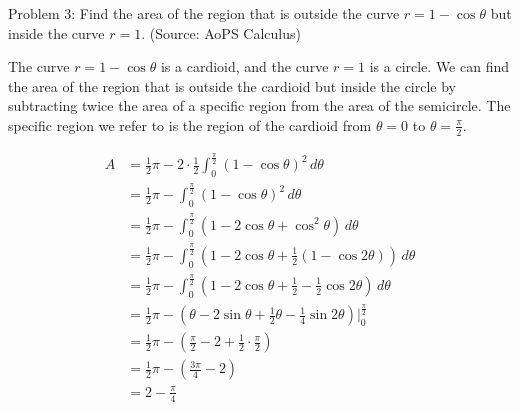 Problem 3: Find the area of the region that is outside the curve $r = 1 - \cos \theta$ but inside the curve $r = 1$. (Source: AoPS Calculus)

The curve $r = 1 - \cos \theta$ is a cardioid, and the curve $r = 1$ is a circle. We can find the area of the region that is outside the cardioid but inside the circle by subtracting twice the area of a specific region from the area of the semicircle. The specific region we refer to is the region of the cardioid from $\theta = 0$ to $\theta = \frac{\pi}{2}$.

\begin{align*}
A &= \frac{1}{2} \pi - 2 \cdot \frac{1}{2} \int_0^{\frac{\pi}{2}} (1 - \cos \theta)^2 \, d\theta \\
&= \frac{1}{2} \pi - \int_0^{\frac{\pi}{2}} (1 - \cos \theta)^2 \, d\theta \\
&= \frac{1}{2} \pi - \int_0^{\frac{\pi}{2}} (1 - 2 \cos \theta + \cos^2 \theta) \, d\theta \\
&= \frac{1}{2} \pi - \int_0^{\frac{\pi}{2}} (1 - 2 \cos \theta + \frac{1}{2}(1 - \cos 2\theta)) \, d\theta \\
&= \frac{1}{2} \pi - \int_0^{\frac{\pi}{2}} (1 - 2 \cos \theta + \frac{1}{2} - \frac{1}{2} \cos 2\theta) \, d\theta \\
&= \frac{1}{2} \pi - (\theta - 2 \sin \theta + \frac{1}{2} \theta - \frac{1}{4} \sin 2\theta) \Bigg|_0^{\frac{\pi}{2}} \\
&= \frac{1}{2} \pi - \left(\frac{\pi}{2} - 2 + \frac{1}{2} \cdot \frac{\pi}{2} \right) \\
&= \frac{1}{2} \pi - \left(\frac{3\pi}{4} - 2 \right) \\
&= \boxed{2 - \frac{\pi}{4}}
\end{align*}
